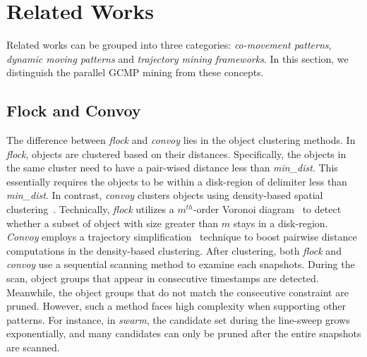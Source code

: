 \section{Related Works}
\label{sec:related_works}
Related works can be grouped into three categories: \emph{co-movement patterns},
\emph{dynamic moving patterns} and \emph{trajectory mining frameworks}.
In this section, we distinguish the parallel GCMP mining from these concepts.


\subsection{Flock and Convoy}
The difference between \emph{flock} and \emph{convoy} lies 
in the object clustering methods. In \emph{flock},
objects are clustered based on their distances. Specifically, the
objects in the same cluster need to have a pair-wised distance less than \emph{min\_dist}. 
This essentially requires the objects to be within a disk-region of delimiter less than \emph{min\_dist}.
In contrast, \emph{convoy} clusters objects using density-based spatial clustering~\cite{ester1996density}.
Technically, \emph{flock} utilizes a $m^{th}$-order Voronoi diagram~\cite{laube2005finding} to detect whether
a subset of object with size greater than $m$ stays in a disk-region. \emph{Convoy} employs
a trajectory simplification~\cite{douglas1973linesimplification} technique to boost pairwise distance computations in
the density-based clustering.
After clustering, both \emph{flock} and \emph{convoy} use a sequential scanning
method to examine each snapshots. During the scan, object
groups that appear in consecutive timestamps are detected. Meanwhile, the object groups that do not
match the consecutive constraint are pruned. 
However, such a method faces high complexity when supporting other patterns.
For instance, in \emph{swarm}, the candidate set during the line-sweep grows
exponentially, and many candidates can only be pruned after the entire snapshots are scanned.

